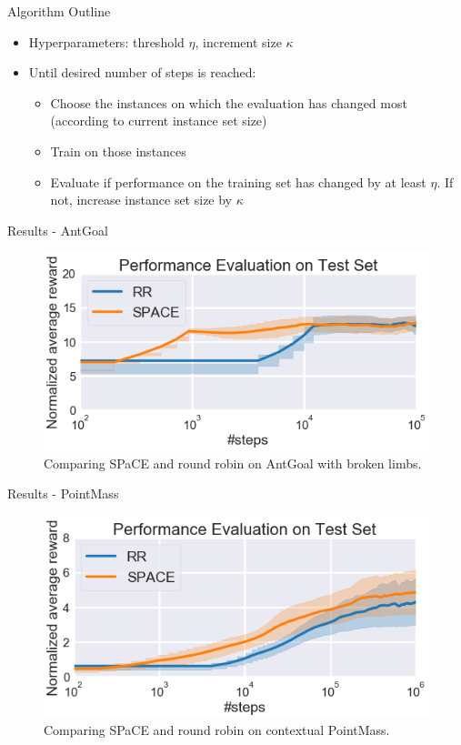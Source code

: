 \begin{frame}[c]{Algorithm Outline}
	
	\begin{itemize}
		\item Hyperparameters: threshold $\eta$, increment size $\kappa$
		\item Until desired number of steps is reached:
		\begin{itemize}
			\item Choose the instances on which the evaluation has changed most (according to current instance set size)
			\item Train on those instances
			\item Evaluate if performance on the training set has changed by at least $\eta$. If not, increase instance set size by $\kappa$
		\end{itemize}
	\end{itemize}
	
\end{frame}

\begin{frame}[c]{Results - AntGoal}
	
\begin{figure}
\centering
\includegraphics[scale=0.25]{images/antgoal}
\caption{Comparing SPaCE and round robin on AntGoal with broken limbs.}
\end{figure}
	
\end{frame}

\begin{frame}[c]{Results - PointMass}
	
\begin{figure}
\centering
\includegraphics[scale=0.25]{images/pointmass}
\caption{Comparing SPaCE and round robin on contextual PointMass.}
\end{figure}
	
\end{frame}


